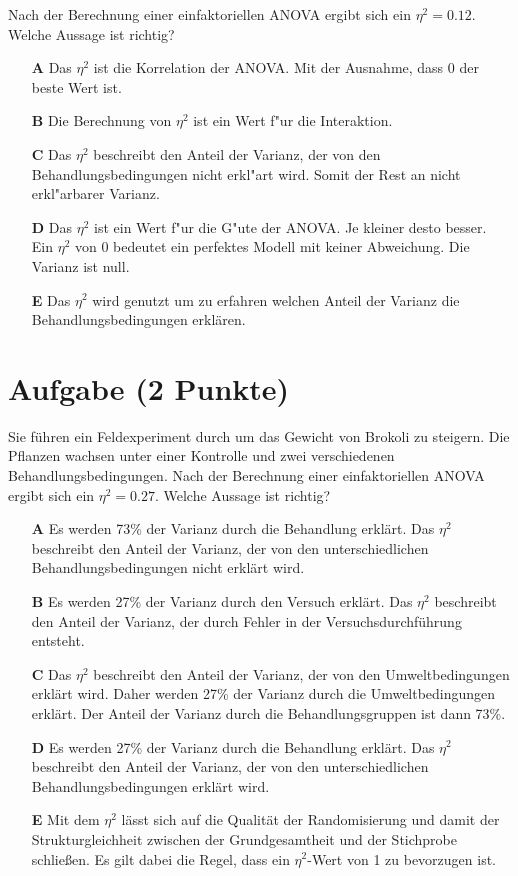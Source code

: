 \documentclass[a4paper, 9pt]{scrartcl}\usepackage[]{graphicx}\usepackage[]{xcolor}
\begin{document}
Nach der Berechnung einer einfaktoriellen ANOVA ergibt sich ein $\eta^2 = 0.12$. Welche Aussage ist richtig?



\begin{enumerate}
\item [\textbf{A} \msquare] Das $\eta^2$ ist die Korrelation der ANOVA. Mit der Ausnahme, dass 0 der beste Wert ist.
\item [\textbf{B} \msquare] Die Berechnung von $\eta^2$ ist ein Wert f{"u}r die Interaktion.
\item [\textbf{C} \msquare] Das $\eta^2$ beschreibt den Anteil der Varianz, der von den Behandlungsbedingungen nicht erkl{"a}rt wird. Somit der Rest an nicht erkl{"a}rbarer Varianz.
\item [\textbf{D} \msquare] Das $\eta^2$ ist ein Wert f{"u}r die G{"u}te der ANOVA. Je kleiner desto besser. Ein $\eta^2$ von 0 bedeutet ein perfektes Modell mit keiner Abweichung. Die Varianz ist null.
\item [\textbf{E} \msquare] Das $\eta^2$ wird genutzt um zu erfahren welchen Anteil der Varianz die Behandlungsbedingungen erklären.
\end{enumerate} 

\section{Aufgabe \hfill (2 Punkte)}



Sie führen ein Feldexperiment durch um das Gewicht von Brokoli zu
steigern. Die Pflanzen wachsen unter einer Kontrolle und zwei verschiedenen
Behandlungsbedingungen. Nach der Berechnung einer einfaktoriellen ANOVA
ergibt sich ein $\eta^2 = 0.27$. Welche Aussage ist richtig?



\begin{enumerate}
\item [\textbf{A} \msquare] Es werden 73\% der Varianz durch die Behandlung erklärt. Das $\eta^2$ beschreibt den Anteil der Varianz, der von den unterschiedlichen Behandlungsbedingungen nicht erklärt wird.
\item [\textbf{B} \msquare] Es werden 27\% der Varianz durch den Versuch erklärt. Das $\eta^2$ beschreibt den Anteil der Varianz, der durch Fehler in der Versuchsdurchführung entsteht.
\item [\textbf{C} \msquare] Das $\eta^2$ beschreibt den Anteil der Varianz, der von den Umweltbedingungen erklärt wird. Daher werden 27\% der Varianz durch die Umweltbedingungen erklärt. Der Anteil der Varianz durch die Behandlungsgruppen ist dann 73\%.
\item [\textbf{D} \msquare] Es werden 27\% der Varianz durch die Behandlung erklärt. Das $\eta^2$ beschreibt den Anteil der Varianz, der von den unterschiedlichen Behandlungsbedingungen erklärt wird.
\item [\textbf{E} \msquare] Mit dem $\eta^2$ lässt sich auf die Qualität der Randomisierung und damit der Strukturgleichheit zwischen der Grundgesamtheit und der Stichprobe schließen. Es gilt dabei die Regel, dass ein $\eta^2$-Wert von 1 zu bevorzugen ist.
\end{enumerate} 
\end{document}
